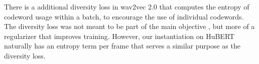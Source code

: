 There is a additional diversity loss in wav2vec 2.0 that
computes the entropy of codeword usage within a batch,
to encourage the use of individual codewords.
The diversity loss was not meant to be part of the main objective
\cite{baevski2020wav2vec}, but more of a regularizer that improves
training.
However, our instantiation on HuBERT naturally has an entropy term
per frame that serves a similar purpose as the diversity loss.

%
%

%
%
%
%
%
%
%
%
%
%
%
%
%
%
%
%
%
%
%
